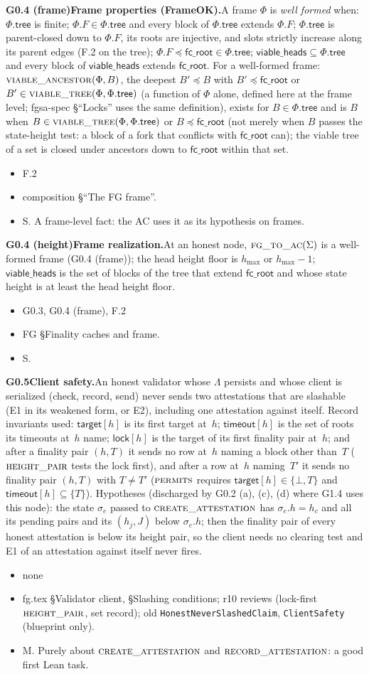 \documentclass{article}
\newcommand{\hmax}{h_{\max}}
\newcommand{\Fr}{\Phi}
\newcommand{\fcroot}{\mathsf{fc\_root}}
\newcommand{\allowed}{\mathsf{viable\_heads}}
\newcommand{\fname}[1]{\text{\textsc{#1}}}
\newcommand{\filtered}{\fname{viable\_tree}}
\newcommand{\dagnode}[6]{%
\par\medskip\noindent\textbf{#1\enspace #2.}\enspace #3
\begin{itemize}[leftmargin=2.2em,itemsep=0pt,topsep=2pt]
\item[\emph{Uses}] #4
\item[\emph{Evid.}] #5
\item[\emph{Task}] #6
\end{itemize}}
\begin{document}
\dagnode{G0.4 (frame)}{Frame properties (\textsf{FrameOK})}{A frame $\Fr$ is
\emph{well formed} when: $\Fr.\mathsf{tree}$ is finite; $\Fr.F\in\Fr.\mathsf{tree}$ and every block of
$\Fr.\mathsf{tree}$ extends $\Fr.F$; $\Fr.\mathsf{tree}$ is parent-closed down
to $\Fr.F$, its roots are injective, and slots strictly increase along its
parent edges (F.2 on the tree); $\Fr.F\preceq\fcroot\in\Fr.\mathsf{tree}$; $\allowed\subseteq
\Fr.\mathsf{tree}$ and every block of $\allowed$ extends $\fcroot$.  For a
well-formed frame: $\fname{viable\_ancestor}(\Fr,B)$, the deepest $B'\preceq B$ with
$B'\preceq\fcroot$ or $B'\in\filtered(\Fr,\Fr.\mathsf{tree})$ (a function of $\Fr$
alone, defined here at the frame level; fgsa-spec \S``Locks'' uses the same
definition), exists for $B\in\Fr.\mathsf{tree}$ and is $B$
when $B\in\filtered(\Fr,\Fr.\mathsf{tree})$ or $B\preceq\fcroot$ (not merely
when $B$ passes the state-height test: a block of a fork that conflicts with
$\fcroot$ can); the viable tree of a set is closed under ancestors down to
$\fcroot$ within that set.}
{F.2}{composition \S``The FG frame''.}{S.  A frame-level fact: the AC uses it
as its hypothesis on frames.}

\dagnode{G0.4 (height)}{Frame realization}{At an honest node,
$\fname{fg\_to\_ac}(\Sigma)$ is a well-formed frame (G0.4 (frame)); the head
height floor is $\hmax$ or $\hmax-1$; $\allowed$ is the set of blocks of the
tree that extend $\fcroot$ and whose state height is at least the head height
floor.}
{G0.3, G0.4 (frame), F.2}{FG \S Finality caches and frame.}{S.}

\dagnode{G0.5}{Client safety}{An honest validator whose $\Lambda$ persists
and whose client is serialized (check, record, send) never sends two
attestations that are slashable (E1 in its weakened form, or E2), including
one attestation against itself.  Record invariants used: $\mathsf{target}[h]$
is its first target at~$h$; $\mathsf{timeout}[h]$ is the set of roots its
timeouts at~$h$ name; $\mathsf{lock}[h]$ is the target of its first finality
pair at~$h$; and after a finality pair $(h,T)$ it sends no row at~$h$ naming a
block other than~$T$ ($\fname{height\_pair}$ tests the lock first), and
after a row at~$h$ naming~$T'$ it sends no finality pair $(h,T)$ with
$T\neq T'$ ($\fname{permits}$ requires $\mathsf{target}[h]\in\{\bot,T\}$ and
$\mathsf{timeout}[h]\subseteq\{T\}$).  Hypotheses (discharged by G0.2 (a),
(c), (d) where G1.4 uses this node): the state $\sigma_e$ passed to
$\fname{create\_attestation}$ has $\sigma_e.h=h_c$ and all its pending pairs
and its $(h_j,J)$ below $\sigma_e.h$; then the finality pair of every honest
attestation is below its height pair, so the client needs no clearing test
and E1 of an attestation against itself never fires.}
{none}{fg.tex \S Validator client, \S Slashing conditions; r10 reviews
(lock-first $\fname{height\_pair}$, set record); old
\texttt{HonestNeverSlashedClaim}, \texttt{ClientSafety} (blueprint only).}{M.  Purely about
$\fname{create\_attestation}$ and $\fname{record\_attestation}$: a good first
Lean task.}
\end{document}
